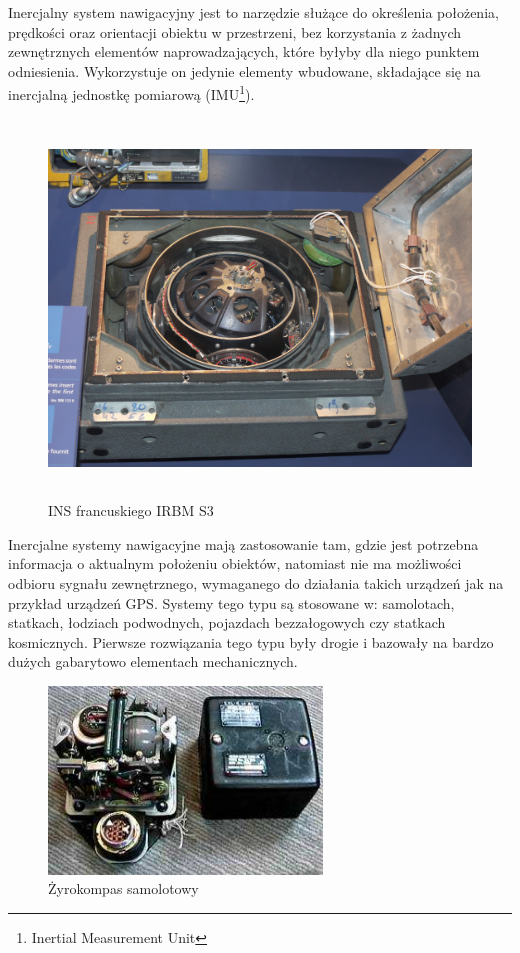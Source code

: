 Inercjalny system nawigacyjny jest to narzędzie służące do określenia położenia,
prędkości oraz orientacji obiektu w przestrzeni, bez korzystania z żadnych
zewnętrznych elementów naprowadzających, które byłyby dla niego punktem
odniesienia. Wykorzystuje on jedynie elementy wbudowane, składające się na
inercjalną jednostkę pomiarową (IMU\footnote{Inertial Measurement Unit}).
\begin{figure}[!ht]
 \centering
 \includegraphics[height=100mm]{../images/ch04/INS-zdjecie.jpg}
 \caption[INS francuskiego IRBM S3]{INS francuskiego IRBM S3\footnotemark}
 \label{fig:Zyrokompas}
\end{figure}

Inercjalne systemy nawigacyjne mają zastosowanie tam, gdzie jest potrzebna
informacja o aktualnym położeniu obiektów, natomiast nie ma możliwości odbioru
sygnału zewnętrznego, wymaganego do działania takich urządzeń jak na przykład urządzeń GPS. 
Systemy tego typu są stosowane w: samolotach, statkach, łodziach podwodnych, pojazdach
bezzałogowych czy statkach kosmicznych. Pierwsze rozwiązania tego typu były drogie i bazowały na bardzo
dużych gabarytowo elementach mechanicznych. 
\begin{figure}[!ht]
 \centering
 \includegraphics[height=50mm]{../images/ch04/gyrocompass.jpg}
 \caption[Żyrokompas samolotowy]{Żyrokompas samolotowy\footnotemark}
 \label{fig:ZyrokompasSamolotowy}
\end{figure}

